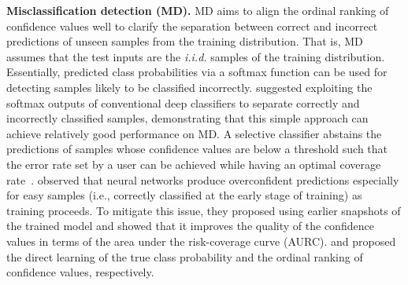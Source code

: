 \documentclass[preprint,12pt]{elsarticle}
\begin{document}
\textbf{Misclassification detection (MD).} 
MD aims to align the ordinal ranking of confidence values well to clarify the separation between correct and incorrect predictions of unseen samples from the training distribution. That is, MD assumes that the test inputs are the \textit{i.i.d.} samples of the training distribution. Essentially, predicted class probabilities via a softmax function can be used for detecting samples likely to be classified incorrectly. \cite{hendrycks2016baseline} suggested exploiting the softmax outputs of conventional deep classifiers to separate correctly and incorrectly classified samples, demonstrating that this simple approach can achieve relatively good performance on MD. A selective classifier abstains the predictions of samples whose confidence values are below a threshold such that the error rate set by a user can be achieved while having an optimal coverage rate~\citep{geifman2017selective}.
\cite{geifman2018bias} observed that neural networks produce overconfident predictions especially for easy samples (i.e., correctly classified at the early stage of training) as training proceeds. To mitigate this issue, they proposed using earlier snapshots of the trained model and showed that it improves the quality of the confidence values in terms of the area under the risk-coverage curve (AURC). \cite{corbiere2019addressing} and \cite{moon2020confidence} proposed the direct learning of the true class probability and the ordinal ranking of confidence values, respectively.
\end{document}
